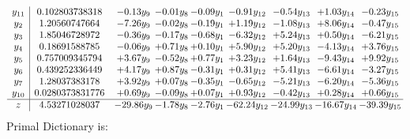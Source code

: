 \documentclass[9pt]{article}
\begin{document}
\[\begin{array}{c| c c@{\hskip 2pt} c@{\hskip 2pt} c@{\hskip 2pt} c@{\hskip 2pt} c@{\hskip 2pt} c@{\hskip 2pt} c@{\hskip 2pt} }
 y_{11}   &  0.102803738318 & -0.13 y_{9} & -0.01 y_{8} & -0.09 y_{1} & -0.91 y_{12} & -0.54 y_{13} & +  1.03 y_{14} & -0.23 y_{15}\\
 y_{2}   &  1.20560747664 & -7.26 y_{9} & -0.02 y_{8} & -0.19 y_{1} & +  1.19 y_{12} & -1.08 y_{13} & +  8.06 y_{14} & -0.47 y_{15}\\
 y_{3}   &  1.85046728972 & -0.36 y_{9} & -0.17 y_{8} & -0.68 y_{1} & -6.32 y_{12} & +  5.24 y_{13} & +  0.50 y_{14} & -6.21 y_{15}\\
 y_{4}   &  0.18691588785 & -0.06 y_{9} & +  0.71 y_{8} & +  0.10 y_{1} & +  5.90 y_{12} & +  5.20 y_{13} & -4.13 y_{14} & +  3.76 y_{15}\\
 y_{5}   &  0.757009345794 & +  3.67 y_{9} & -0.52 y_{8} & +  0.77 y_{1} & +  3.23 y_{12} & +  1.64 y_{13} & -9.43 y_{14} & +  9.92 y_{15}\\
 y_{6}   &  0.439252336449 & +  4.17 y_{9} & +  0.87 y_{8} & -0.31 y_{1} & +  0.31 y_{12} & +  5.41 y_{13} & -6.61 y_{14} & -3.27 y_{15}\\
 y_{7}   &  1.28037383178 & +  3.92 y_{9} & +  0.07 y_{8} & -0.35 y_{1} & -0.65 y_{12} & -5.21 y_{13} & -6.20 y_{14} & -5.36 y_{15}\\
 y_{10}   &  0.0280373831776 & +  0.69 y_{9} & -0.09 y_{8} & +  0.07 y_{1} & +  0.93 y_{12} & -0.42 y_{13} & +  0.28 y_{14} & +  0.66 y_{15}\\
\hline
z    &  4.53271028037 & -29.86 y_{9} & -1.78 y_{8} & -2.76 y_{1} & -62.24 y_{12} & -24.99 y_{13} & -16.67 y_{14} & -39.39 y_{15}\\
\end{array}\]
Primal Dictionary is:
\end{document}
